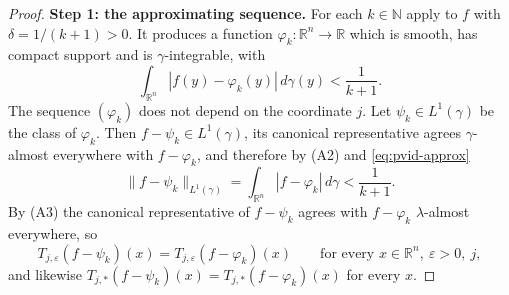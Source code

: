 \begin{proof}
\medskip
\noindent\textbf{Step 1: the approximating sequence.}
For each $k \in \mathbb{N}$ apply  to $f$
with $\delta = 1/(k+1) > 0$.  It produces a function
$\varphi_k : \mathbb{R}^n \to \mathbb{R}$ which is smooth, has compact support
and is $\gamma$-integrable, with
\begin{equation}\label{eq:pvid-approx}
  \int_{\mathbb{R}^n}|f(y) - \varphi_k(y)|\,d\gamma(y) < \frac1{k+1} .
\end{equation}
The sequence $(\varphi_k)$ does not depend on the coordinate $j$.  Let
$\psi_k \in L^1(\gamma)$ be the class of $\varphi_k$.  Then
$f - \psi_k \in L^1(\gamma)$, its canonical representative agrees
$\gamma$-almost everywhere with $f - \varphi_k$, and therefore by (A2) and
\eqref{eq:pvid-approx}
\begin{equation}\label{eq:pvid-approx-norm}
  \|f - \psi_k\|_{L^1(\gamma)}
    = \int_{\mathbb{R}^n}|f - \varphi_k|\,d\gamma < \frac1{k+1} .
\end{equation}
By (A3) the canonical representative of $f - \psi_k$ agrees with
$f - \varphi_k$ $\lambda$-almost everywhere, so
\begin{equation}\label{eq:pvid-rep}
  T_{j,\varepsilon}(f - \psi_k)(x) = T_{j,\varepsilon}(f - \varphi_k)(x)
  \qquad\text{for every } x \in \mathbb{R}^n,\ \varepsilon > 0,\ j ,
\end{equation}
and likewise $T_{j,*}(f-\psi_k)(x) = T_{j,*}(f-\varphi_k)(x)$ for every $x$.


\end{proof}
